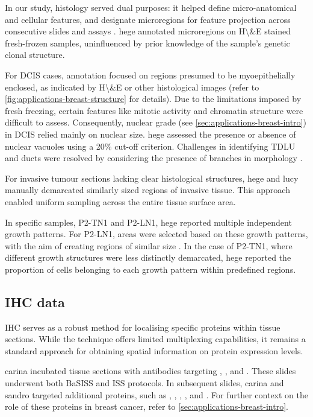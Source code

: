 In our study, histology served dual purposes: it helped define micro-anatomical and cellular features, and designate microregions for feature projection across consecutive slides and assays . \acl{hege} annotated microregions on \acf{H\&E} stained fresh-frozen samples, uninfluenced by prior knowledge of the sample's genetic clonal structure.

For \acf{DCIS} cases, annotation focused on regions presumed to be myoepithelially enclosed, as indicated by \ac{H\&E} or other histological images (refer to \cref{fig:applications-breast-structure} for details). Due to the limitations imposed by fresh freezing, certain features like mitotic activity and chromatin structure were difficult to assess. Consequently, nuclear grade (see \cref{sec:applications-breast-intro}) in \ac{DCIS} relied mainly on nuclear size. \acs{hege} assessed the presence or absence of nuclear vacuoles using a 20\% cut-off criterion. Challenges in identifying \ac{TDLU} and ducts were resolved by considering the presence of branches in morphology .

For invasive tumour sections lacking clear histological structures, \acs{hege} and \acs{lucy} manually demarcated similarly sized regions of invasive tissue. This approach enabled uniform sampling across the entire tissue surface area.

In specific samples, P2-TN1 and P2-LN1, \acs{hege} reported multiple independent growth patterns. For P2-LN1, areas were selected based on these growth patterns, with the aim of creating regions of similar size . In the case of P2-TN1, where different growth structures were less distinctly demarcated, \acs{hege} reported the proportion of cells belonging to each growth pattern within predefined regions.

\subsection{\acl{IHC} data}
\label{sec:modalities-ihc}

\acl{IHC} serves as a robust method for localising specific proteins within tissue sections. While the technique offers limited multiplexing capabilities, it remains a standard approach for obtaining spatial information on protein expression levels.

\acf{carina} incubated tissue sections with antibodies targeting , , and . These slides underwent both \ac{BaSISS} and \ac{ISS} protocols. In subsequent slides, \acs{carina} and \acs{sandro} targeted additional proteins, such as , , , , and . For further context on the role of these proteins in breast cancer, refer to \cref{sec:applications-breast-intro}.

